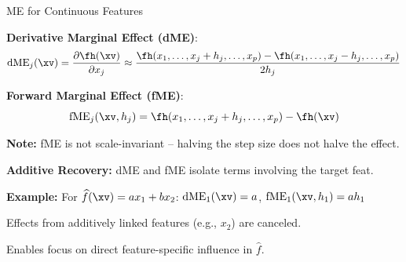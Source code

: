 \documentclass[10pt,compress,t,notes=noshow, xcolor=table]{beamer}
\begin{document}
\begin{framei}[align=top]{ME for Continuous Features}
\item \textbf{Derivative Marginal Effect (dME)}:
$$
\text{dME}_j(\xv) = \frac{\partial \fh(\xv)}{\partial x_j} \approx \frac{\fh(x_1, \dots, x_j + h_j, \dots, x_p) - \fh(x_1, \dots, x_j - h_j, \dots, x_p)}{2h_j}
$$
\item \textbf{Forward Marginal Effect (fME)}:
$$
\text{fME}_j(\xv, h_j) = \fh(x_1, \dots, x_j + h_j, \dots, x_p) - \fh(\xv)
$$
\item \textbf{Note:} fME is not scale-invariant -- halving the step size does not halve the effect.
\item \textbf{Additive Recovery:} dME and fME isolate terms involving the target feat.
\begin{itemizeS}
\item \textbf{Example:} For $\widehat{f}(\xv) = a x_1 + b x_2$:
$\text{dME}_1(\xv) = a$, \quad $\text{fME}_1(\xv, h_1) = a h_1$
\item Effects from additively linked features (e.g., $x_2$) are canceled.
\item Enables focus on direct feature-specific influence in $\widehat{f}$.
\end{itemizeS}
\end{framei}
\end{document}
